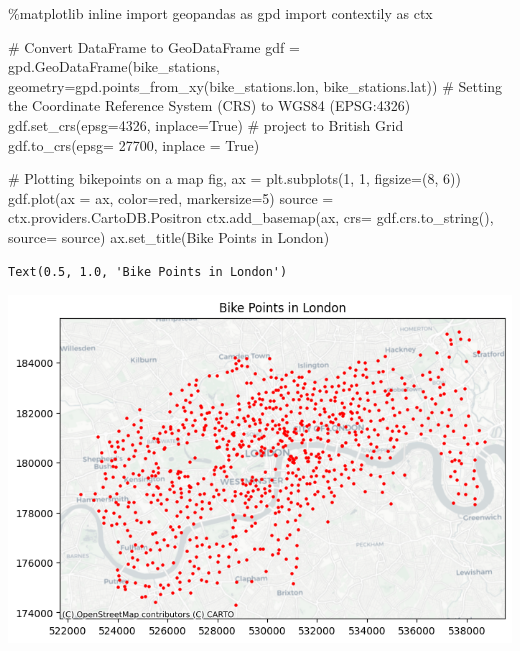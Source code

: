 \documentclass[
  letterpaper,
  DIV=11,
  numbers=noendperiod]{scrreprt}
\newenvironment{Shaded}{\begin{snugshade}}{\end{snugshade}}
\newcommand{\CommentTok}[1]{\textcolor[rgb]{0.37,0.37,0.37}{#1}}
\newcommand{\DecValTok}[1]{\textcolor[rgb]{0.68,0.00,0.00}{#1}}
\newcommand{\ImportTok}[1]{\textcolor[rgb]{0.00,0.46,0.62}{#1}}
\newcommand{\NormalTok}[1]{\textcolor[rgb]{0.00,0.23,0.31}{#1}}
\newcommand{\OperatorTok}[1]{\textcolor[rgb]{0.37,0.37,0.37}{#1}}
\newcommand{\StringTok}[1]{\textcolor[rgb]{0.13,0.47,0.30}{#1}}
\newcommand{\VariableTok}[1]{\textcolor[rgb]{0.07,0.07,0.07}{#1}}
\begin{document}
\begin{Shaded}
\begin{Highlighting}[]
\OperatorTok{\%}\NormalTok{matplotlib inline}
\ImportTok{import}\NormalTok{ geopandas }\ImportTok{as}\NormalTok{ gpd}
\ImportTok{import}\NormalTok{ contextily }\ImportTok{as}\NormalTok{ ctx}

\CommentTok{\# Convert DataFrame to GeoDataFrame}
\NormalTok{gdf }\OperatorTok{=}\NormalTok{ gpd.GeoDataFrame(bike\_stations, geometry}\OperatorTok{=}\NormalTok{gpd.points\_from\_xy(bike\_stations.lon, bike\_stations.lat))}
\CommentTok{\# Setting the Coordinate Reference System (CRS) to WGS84 (EPSG:4326)}
\NormalTok{gdf.set\_crs(epsg}\OperatorTok{=}\DecValTok{4326}\NormalTok{, inplace}\OperatorTok{=}\VariableTok{True}\NormalTok{)}
\CommentTok{\# project to British Grid}
\NormalTok{gdf.to\_crs(epsg}\OperatorTok{=} \DecValTok{27700}\NormalTok{, inplace }\OperatorTok{=} \VariableTok{True}\NormalTok{)}

\CommentTok{\# Plotting bikepoints on a map}
\NormalTok{fig, ax }\OperatorTok{=}\NormalTok{ plt.subplots(}\DecValTok{1}\NormalTok{, }\DecValTok{1}\NormalTok{, figsize}\OperatorTok{=}\NormalTok{(}\DecValTok{8}\NormalTok{, }\DecValTok{6}\NormalTok{))}
\NormalTok{gdf.plot(ax }\OperatorTok{=}\NormalTok{ ax, color}\OperatorTok{=}\StringTok{\textquotesingle{}red\textquotesingle{}}\NormalTok{, markersize}\OperatorTok{=}\DecValTok{5}\NormalTok{)}
\NormalTok{source }\OperatorTok{=}\NormalTok{ ctx.providers.CartoDB.Positron}
\NormalTok{ctx.add\_basemap(ax, crs}\OperatorTok{=}\NormalTok{ gdf.crs.to\_string(), source}\OperatorTok{=}\NormalTok{ source)}
\NormalTok{ax.set\_title(}\StringTok{\textquotesingle{}Bike Points in London\textquotesingle{}}\NormalTok{)}
\end{Highlighting}
\end{Shaded}

\begin{verbatim}
Text(0.5, 1.0, 'Bike Points in London')
\end{verbatim}

\includegraphics{labs/w03_webArch_files/figure-pdf/cell-16-output-2.png}
\end{document}
